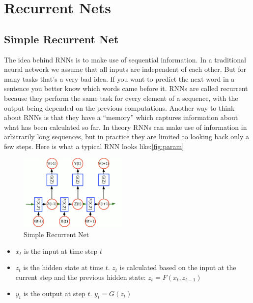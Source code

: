 \chapter{Recurrent Nets}

\section{Simple Recurrent Net}

The idea behind RNNs is to make use of sequential information. 
In a traditional neural network we assume that all inputs are independent of each other.
But for many tasks that’s a very bad idea. 
If you want to predict the next word in a sentence you better know which words came before it. 
RNNs are called recurrent because they perform the same task for every element of a sequence, with the output being depended on the previous computations. 
Another way to think about RNNs is that they have a “memory” which captures information about what has been calculated so far. 
In theory RNNs can make use of information in arbitrarily long sequences, but in practice they are limited to looking back only a few steps. 
Here is what a typical RNN looks like:\cref{fig:param}

\begin{figure}[h]
    \centering
    \includegraphics[width=150pt]{lectures/06-b-rnn/image/rnn.png}
    \caption{Simple Recurrent Net}
    \label{fig:Simple RNN}
\end{figure}

\begin{itemize}
  \item $x_{t}$ is the input at time step $t$
  \item $z_{t}$ is the hidden state at time $t$. $z_{t}$ is calculated based on the input at the current step and the previous hidden state:
  $z_t = F(x_t, z_{t-1})$
  \item $y_t$ is the output at step $t$. $y_t = G(z_t)$
\end{itemize}



